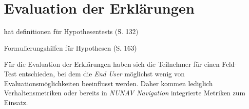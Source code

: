 \section{Evaluation der Erklärungen}

\cite{wohlin2012experimentation} hat definitionen für Hypothesentests (S. 132)

\cite{wohlin2012experimentation} Formulierungshilfen für Hypothesen (S. 163)

Für die Evaluation der Erklärungen haben sich die Teilnehmer für einen Feld-Test entschieden, bei dem die \textit{End User} möglichst wenig von Evaluationsmöglichkeiten beeinflusst werden. Daher kommen lediglich Verhaltensmetriken oder bereits in \textit{NUNAV Navigation} integrierte Metriken zum Einsatz.







